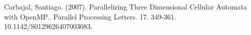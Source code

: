 \documentclass[conference,compsoc]{IEEEtran}
\begin{document}
%
%
%
\begin{thebibliography}{1}

Carbajal, Santiago. (2007). Parallelizing Three Dimensional Cellular Automata with OpenMP.. Parallel Processing Letters. 17. 349-361. 10.1142/S0129626407003083. 


\end{thebibliography}
\end{document}
